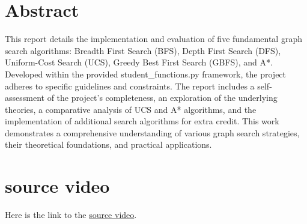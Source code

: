 \section{Abstract}

\qquad This report details the implementation and evaluation of five fundamental graph search algorithms: Breadth First Search (BFS), Depth First Search (DFS), Uniform-Cost Search (UCS), Greedy Best First Search (GBFS), and A*. Developed within the provided student\_functions.py framework, the project adheres to specific guidelines and constraints. The report includes a self-assessment of the project's completeness, an exploration of the underlying theories, a comparative analysis of UCS and A* algorithms, and the implementation of additional search algorithms for extra credit. This work demonstrates a comprehensive understanding of various graph search strategies, their theoretical foundations, and practical applications.

\section{source video}
Here is the link to the \href{https://drive.google.com/drive/folders/1f-bkZnT4g-qskH6K7UEXmzV7ogh_MPTy?usp=drive_link}{source video}.
\pagebreak